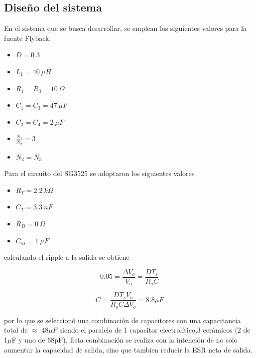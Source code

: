 %
%
%

\subsection{Diseño del sistema}

En el sistema que se busca desarrollar, se emplean los siguientes valores para la fuente Flyback:
\begin{multicols}{2}
\begin{itemize}
	\item $D = 0.3$
	\item $L_1 = 40 \ \mu H$
	\item $R_1 = R_3 = 10 \ \Omega$
	\item $C_1 = C_3 = 47 \ \mu F$
	\item $C_2 = C_4 = 2 \ \mu F$
	\item $\frac{N_1}{N_2} = 3 $
	\item $N_2 = N_3 $
\end{itemize}
\end{multicols}

Para el circuito del SG3525 se adoptaron los siguientes valores
\begin{multicols}{2}
\begin{itemize}
	\item $R_T = 2.2  \ k\Omega$
	\item $C_T = 3.3 \ n F$
	\item $R_D = 0 \ \Omega$
	\item $C_{ss} = 1 \ \mu F$
\end{itemize}
\end{multicols}

calculando el ripple a la salida se obtiene

\begin{equation}
0.05 = \frac{\Delta V_o}{V_o} = \frac{DT_s}{R_oC}
\end{equation}

\begin{equation}
C = \frac{DT_sV_o}{R_oC\Delta V_o} = 8.8 \mu F
\end{equation}

por lo que se seleccionó una combinación de capacitores con una capacitancia total de $\approx$ 48$\mu F$ siendo el paralelo de 1 capacitor electrolítico,3 cerámicos (2 de 1$\mu$F y uno de 68pF). Esta combinación se realiza con la intención de no solo aumentar la capacidad de salida, sino que tambien reducir la ESR neta de salida.  


